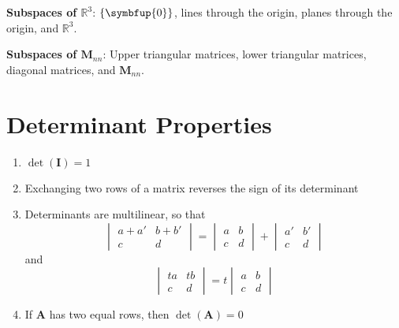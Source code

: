 \documentclass{article}
\begin{document}
\begin{multicols*}{2}
    \textbf{Subspaces of \(\mathbb{R}^3\)}: \(\left\{ \symbfup{0} \right\}\),
    lines through the origin, planes through the origin, and \(\mathbb{R}^3\).

    \textbf{Subspaces of \(\symbf{M}_{nn}\)}: Upper triangular matrices,
    lower triangular matrices, diagonal matrices, and \(\symbf{M}_{nn}\).
    \section*{Determinant Properties}
    \begin{enumerate}
        \item \(\det{\left( \symbf{I} \right)}=1\)
        \item Exchanging two rows of a matrix reverses the sign of its determinant
        \item Determinants are multilinear, so that
              \begin{equation*}
                  \begin{vmatrix}
                      a+a' & b+b' \\
                      c    & d
                  \end{vmatrix}
                  =
                  \begin{vmatrix}
                      a & b \\
                      c & d
                  \end{vmatrix}
                  +
                  \begin{vmatrix}
                      a' & b' \\
                      c  & d
                  \end{vmatrix}
              \end{equation*}
              and
              \begin{equation*}
                  \begin{vmatrix}
                      ta & tb \\
                      c  & d
                  \end{vmatrix} = t
                  \begin{vmatrix}
                      a & b \\
                      c & d
                  \end{vmatrix}
              \end{equation*}
        \item If \(\symbf{A}\) has two equal rows, then \(\det{\left( \symbf{A} \right)}=0\)

\end{enumerate}
\end{multicols*}
\end{document}
